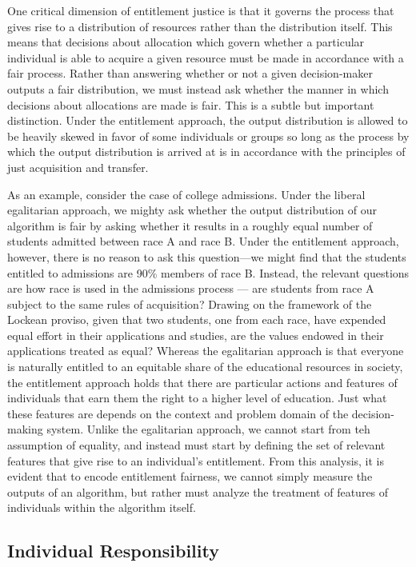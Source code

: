 One critical dimension of entitlement justice is that it governs the process
that gives rise to a distribution of resources rather than the distribution
itself. This means that decisions about allocation which govern whether a
particular individual is able to acquire a given resource must be made in
accordance with a fair process. Rather than answering whether or not a given
decision-maker outputs a fair distribution, we must instead ask whether the
manner in which decisions about allocations are made is fair. This is a
subtle but important distinction. Under the entitlement approach, the output
distribution is allowed to be heavily skewed in favor of some individuals or
groups so long as the process by which the output distribution is arrived at is
in accordance with the principles of just acquisition and transfer.

As an example, consider the case of college admissions. Under the liberal
egalitarian approach, we mighty ask whether the output distribution of our
algorithm is fair by asking whether it results in a roughly equal number of
students admitted between race A and race B. Under the entitlement approach,
however, there is no reason to ask this question—we might find that the
students entitled to admissions are 90\% members of race B. Instead, the
relevant questions are how race is used in the admissions process — are
students from race A subject to the same rules of acquisition? Drawing on the
framework of the Lockean proviso, given that two students, one from each race,
have expended equal effort in their applications and studies, are the values
endowed in their applications treated as equal? Whereas the egalitarian approach
is that everyone is naturally entitled to an equitable share of the educational
resources in society, the entitlement approach holds that there are particular
actions and features of individuals that earn them the right to a higher level
of education.  Just what these features are depends on the context and problem 
domain of the decision-making system. Unlike the egalitarian approach, we cannot
start from teh assumption of equality, and instead must start by defining the 
set of relevant features that give rise to an individual's entitlement. From
this analysis, it is evident that to encode entitlement fairness, we cannot
simply measure the outputs of an algorithm, but rather must analyze the
treatment of features of individuals within the algorithm itself.

\subsection{Individual Responsibility}

